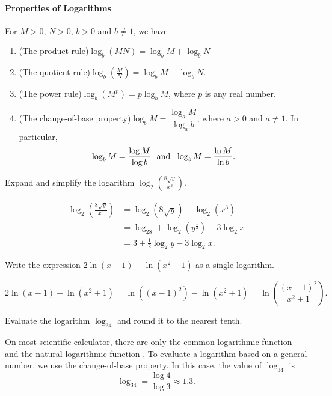 

\paragraph*{Properties of Logarithms}
	For $M>0$, $N>0$, $b>0$ and $b\neq 1$, we have
	\begin{enumerate}
		\item (The product rule)\quad $\log_b(MN)=\log_bM+\log_bN$
		\item (The quotient rule)\quad $\log_b(\frac MN)=\log_bM-\log_bN$.
		\item (The power rule)\quad  $\log_b(M^p)=p\log_bM$, where $p$ is any real number.
		\item (The change-of-base property)\quad  $\log_bM=\dfrac{\log_aM}{\log_ab}$, where $a>0$ and $a\neq 1$. In particular,
		      \[\log_bM=\dfrac{\log M}{\log b} \textup{~~and~~} \log_bM=\dfrac{\ln M}{\ln b}.\]
	\end{enumerate}

	\begin{example}
		Expand and simplify the logarithm $\log_2\left(\frac{8\sqrt{y}}{x^3}\right)$.
	\end{example}
	\begin{solution}
		\[
			\begin{split}
				\log_2\left(\frac{8\sqrt{y}}{x^3}\right)&=\log_2(8\sqrt{y})-\log_2(x^3)\\
				&=\log_28+\log_2(y^{\frac{1}{2}})-3\log_2x\\
				&=3+\frac{1}{2}\log_2y-3\log_2x.
			\end{split}
		\]
	\end{solution}


	\begin{example}
		Write the expression $2\ln(x-1)-\ln(x^2+1)$ as a single logarithm.
	\end{example}
	\begin{solution}
		\[
			2\ln(x-1)-\ln(x^2+1)=\ln((x-1)^2)-\ln(x^2+1)=\ln\left(\frac{(x-1)^2}{x^2+1}\right).
		\]
	\end{solution}


	\begin{example}
		Evaluate the logarithm $\log_34$ and round it to the nearest tenth.
	\end{example}
	\begin{solution}
		On most scientific calculator, there are only the common logarithmic function  and the natural logarithmic function . To evaluate a logarithm based on a general number, we use the change-of-base property. In this case, the value of $\log_34$ is \[\log_34=\frac{\log4}{\log3}\approx 1.3.\]
	\end{solution}


